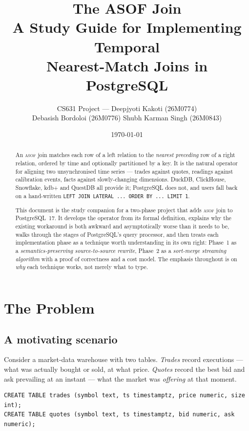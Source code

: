 \documentclass[11pt,a4paper]{report}
\title{\vspace{-1.5cm}\Huge \textbf{The ASOF Join}\\[0.3cm]
       \Large A Study Guide for Implementing Temporal\\ Nearest-Match Joins in PostgreSQL}
\author{CS631 Project --- Deepjyoti Kakoti (26M0774)\\
        Debasish Bordoloi (26M0776) \quad Shubh Karman Singh (26M0843)}
\date{\today}
\theoremstyle{definition}
\theoremstyle{plain}
\newcommand{\code}[1]{\texttt{\small #1}}
\newcommand{\asof}{{\normalfont\scshape asof}}
\begin{document}
\maketitle

\begin{abstract}
\noindent
An \asof{} join matches each row of a left relation to the \emph{nearest preceding} row of
a right relation, ordered by time and optionally partitioned by a key. It is the natural
operator for aligning two unsynchronised time series --- trades against quotes, readings
against calibration events, facts against slowly-changing dimensions. DuckDB, ClickHouse,
Snowflake, kdb+ and QuestDB all provide it; PostgreSQL does not, and users fall back on a
hand-written \code{LEFT JOIN LATERAL ... ORDER BY ... LIMIT 1}.

This document is the study companion for a two-phase project that adds \asof{} join to
PostgreSQL~17. It develops the operator from its formal definition, explains why the
existing workaround is both awkward and asymptotically worse than it needs to be, walks
through the stages of PostgreSQL's query processor, and then treats each implementation
phase as a technique worth understanding in its own right: Phase~1 as a
\emph{semantics-preserving source-to-source rewrite}, Phase~2 as a \emph{sort-merge
streaming algorithm} with a proof of correctness and a cost model. The emphasis throughout
is on \emph{why} each technique works, not merely what to type.
\end{abstract}

\tableofcontents

\chapter{The Problem}

\section{A motivating scenario}

Consider a market-data warehouse with two tables. \emph{Trades} record executions --- what
was actually bought or sold, at what price. \emph{Quotes} record the best bid and ask
prevailing at an instant --- what the market was \emph{offering} at that moment.

\begin{lstlisting}
CREATE TABLE trades (symbol text, ts timestamptz, price numeric, size int);
CREATE TABLE quotes (symbol text, ts timestamptz, bid numeric, ask numeric);
\end{lstlisting}
\end{document}
